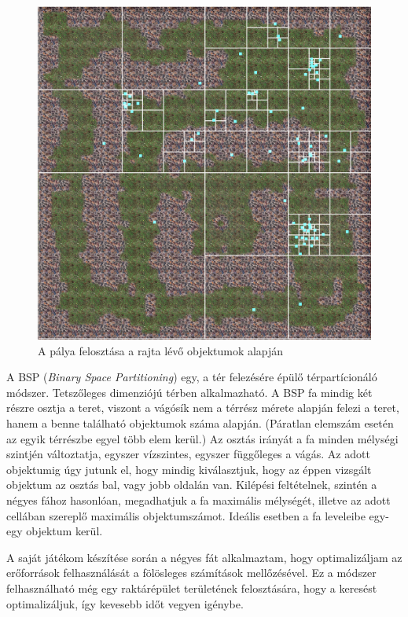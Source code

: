 \begin{figure}[h]
\centering
\includegraphics[scale=0.3]{kepek/quadtree.png}
\caption{A pálya felosztása a rajta lévő objektumok alapján}
\label{fig:quadtree}
\end{figure}


A BSP (\textit{Binary Space Partitioning}) egy, a tér felezésére épülő térpartícionáló módszer. Tetszőleges dimenziójú térben alkalmazható. A BSP fa mindig két részre osztja a teret, viszont a vágósík nem a térrész mérete alapján felezi a teret, hanem a benne található objektumok száma alapján. (Páratlan elemszám esetén az egyik térrészbe egyel több elem kerül.) Az osztás irányát a fa minden mélységi szintjén változtatja, egyszer vízszintes, egyszer függőleges a vágás. Az adott objektumig úgy jutunk el, hogy mindig kiválasztjuk, hogy az éppen vizsgált objektum az osztás bal, vagy jobb oldalán van. Kilépési feltételnek, szintén a négyes fához hasonlóan, megadhatjuk a fa maximális mélységét, illetve az adott cellában szereplő maximális objektumszámot. Ideális esetben a fa leveleibe egy-egy objektum kerül.


A saját játékom készítése során a négyes fát alkalmaztam, hogy optimalizáljam az erőforrások felhasználását a fölösleges számítások mellőzésével. Ez a módszer felhasználható még egy raktárépület területének felosztására, hogy a keresést optimalizáljuk, így kevesebb időt vegyen igénybe.

